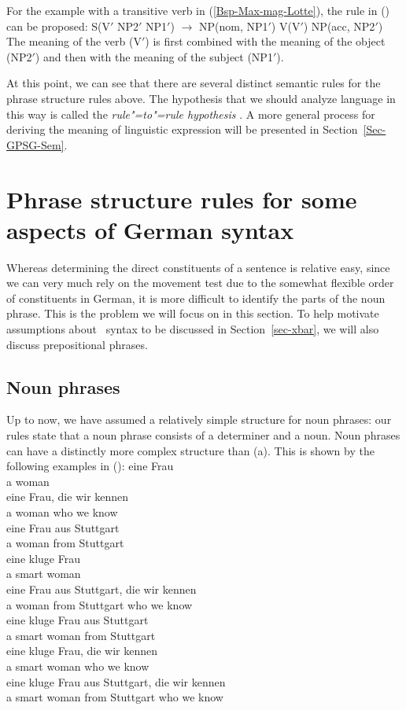\noindent
For the example with a transitive verb in (\ref{Bsp-Max-mag-Lotte}), the rule in () can be proposed:
\ea
S(V$'$ NP2$'$ NP1$'$) $\to$ NP(nom, NP1$'$) V(V$'$) NP(acc, NP2$'$)
\z
The meaning of the verb (V$'$) is first combined with the meaning of the object (NP2$'$) and then with the meaning of the subject (NP1$'$). 

At this point, we can see that there are several distinct semantic rules for the phrase structure rules above. The hypothesis that we should analyze language
in this way is called the \emph{rule"=to"=rule hypothesis}
\citep[]{Bach76a}. A more general process for deriving the
meaning of linguistic expression will be presented in Section~\ref{Sec-GPSG-Sem}.

\section{Phrase structure rules for some aspects of German syntax}

Whereas determining the direct constituents of a sentence is relative easy, since we can very much rely on the movement test due to the
somewhat flexible order of constituents in German, it is more difficult to identify the parts of the noun phrase. This is the problem
we will focus on in this section. To help motivate assumptions about \xbar~syntax to be discussed in Section~\ref{sec-xbar},
we will also discuss prepositional phrases.


\subsection{Noun phrases}
\label{sec-psg-np}

Up to now, we have assumed a relatively simple structure for noun phrases: our rules state that a noun phrase consists of a determiner and a
noun. Noun phrases can have a distinctly more complex structure than (a). This is shown by the following examples in ():
\eal
\label{Beispiele-NP-Adjunkte}
\ex 
\gll eine Frau\\
	 a woman\\
\ex 
\gll eine Frau, die wir kennen\\
	 a woman who we know\\
\ex 
\gll eine Frau aus Stuttgart\\
	 a woman from Stuttgart\\
\ex 
\gll eine kluge Frau\\
	 a smart woman\\
\ex 
\gll eine Frau aus Stuttgart, die wir kennen\\
	 a woman from Stuttgart who we know\\
\ex 
\gll eine kluge Frau aus Stuttgart\\
	 a smart woman from Stuttgart\\
\ex 
\gll eine kluge Frau, die wir kennen\\
	 a smart woman who we know\\
\ex 
\gll eine kluge Frau aus Stuttgart, die wir kennen\\
	 a smart woman from Stuttgart who we know\\
\zl

